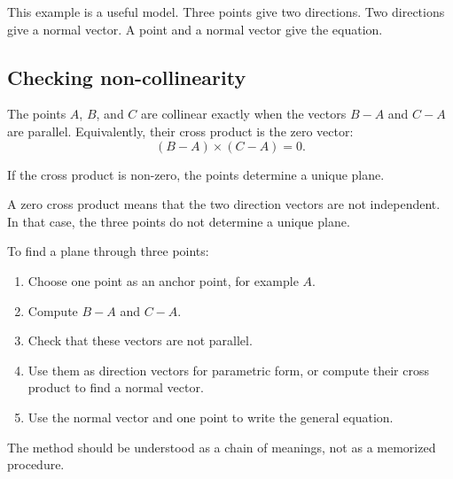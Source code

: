 This example is a useful model. Three points give two directions. Two directions give a normal vector. A point and a normal vector give the equation.

\subsection*{Checking non-collinearity}

The points \(A\), \(B\), and \(C\) are collinear exactly when the vectors \(B-A\) and \(C-A\) are parallel. Equivalently, their cross product is the zero vector:
\[
(B-A)\times(C-A)=0.
\]

If the cross product is non-zero, the points determine a unique plane.

\begin{remarkbox}
A zero cross product means that the two direction vectors are not independent. In that case, the three points do not determine a unique plane.
\end{remarkbox}

\begin{summarybox}
To find a plane through three points:
\begin{enumerate}
\item Choose one point as an anchor point, for example \(A\).
\item Compute \(B-A\) and \(C-A\).
\item Check that these vectors are not parallel.
\item Use them as direction vectors for parametric form, or compute their cross product to find a normal vector.
\item Use the normal vector and one point to write the general equation.
\end{enumerate}
\end{summarybox}

The method should be understood as a chain of meanings, not as a memorized procedure.